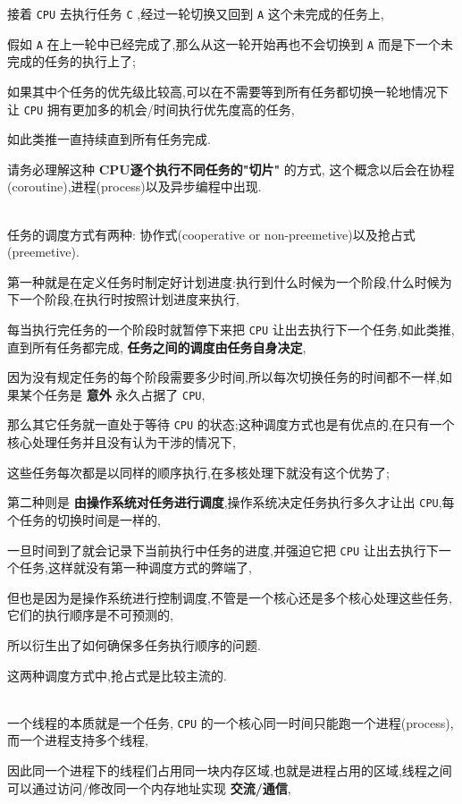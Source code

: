 \documentclass[11pt]{article}
\begin{document}
接着 \texttt{CPU} 去执行任务 \texttt{C} ,经过一轮切换又回到 \texttt{A} 这个未完成的任务上,

假如 \texttt{A} 在上一轮中已经完成了,那么从这一轮开始再也不会切换到 \texttt{A} 而是下一个未完成的任务的执行上了;

如果其中个任务的优先级比较高,可以在不需要等到所有任务都切换一轮地情况下让 \texttt{CPU} 拥有更加多的机会/时间执行优先度高的任务,

如此类推一直持续直到所有任务完成.

请务必理解这种 \textbf{CPU逐个执行不同任务的"切片"} 的方式, 这个概念以后会在协程(coroutine),进程(process)以及异步编程中出现.

\\[0pt]

任务的调度方式有两种: 协作式(cooperative or non-preemetive)以及抢占式(preemetive).

第一种就是在定义任务时制定好计划进度:执行到什么时候为一个阶段,什么时候为下一个阶段,在执行时按照计划进度来执行,

每当执行完任务的一个阶段时就暂停下来把 \texttt{CPU} 让出去执行下一个任务,如此类推,直到所有任务都完成, \textbf{任务之间的调度由任务自身决定},

因为没有规定任务的每个阶段需要多少时间,所以每次切换任务的时间都不一样,如果某个任务是 \textbf{意外} 永久占据了 \texttt{CPU},

那么其它任务就一直处于等待 \texttt{CPU} 的状态;这种调度方式也是有优点的,在只有一个核心处理任务并且没有认为干涉的情况下,

这些任务每次都是以同样的顺序执行,在多核处理下就没有这个优势了;

第二种则是 \textbf{由操作系统对任务进行调度},操作系统决定任务执行多久才让出 \texttt{CPU},每个任务的切换时间是一样的,

一旦时间到了就会记录下当前执行中任务的进度,并强迫它把 \texttt{CPU} 让出去执行下一个任务,这样就没有第一种调度方式的弊端了,

但也是因为是操作系统进行控制调度,不管是一个核心还是多个核心处理这些任务,它们的执行顺序是不可预测的,

所以衍生出了如何确保多任务执行顺序的问题.

这两种调度方式中,抢占式是比较主流的.

\\[0pt]

一个线程的本质就是一个任务, \texttt{CPU} 的一个核心同一时间只能跑一个进程(process),而一个进程支持多个线程,

因此同一个进程下的线程们占用同一块内存区域,也就是进程占用的区域,线程之间可以通过访问/修改同一个内存地址实现 \textbf{交流/通信},
\end{document}
